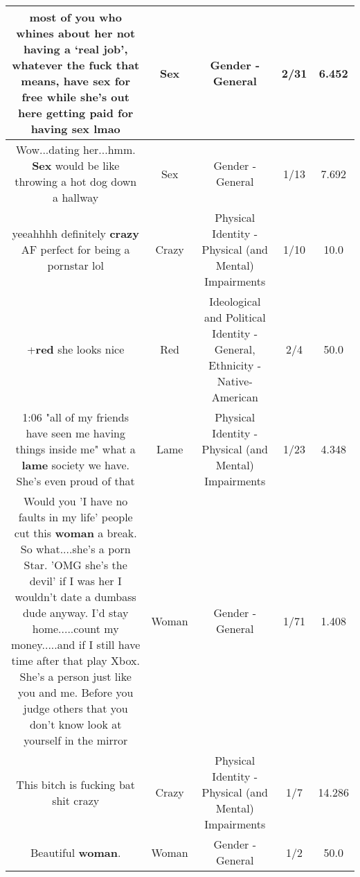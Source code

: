 \documentclass[11pt]{article}
\newlength\mylength
\begin{document}
\begin{center}
\begin{longtable}{|C{.65\mylength}|C{.30\mylength}|C{.12\mylength}|C{.12\mylength}|C{.12\mylength}|}
  \small most of you who whines about her not having a ‘real job', whatever the fuck that means, have \textbf{sex} for free while she's out here getting paid for having \textbf{sex} lmao\normalsize   & Sex & Gender - General & 2/31 & 6.452 \\  \hline
  \small Wow...dating her...hmm. \textbf{Sex} would be like throwing a hot dog down a hallway\normalsize   & Sex & Gender - General & 1/13 & 7.692 \\  \hline
  \small yeeahhhh definitely \textbf{crazy} AF perfect for being a pornstar lol\normalsize   & Crazy & Physical Identity - Physical (and Mental) Impairments & 1/10 & 10.0 \\  \hline
  \small +\textbf{r\textbf{ed}} she looks nice\normalsize   & Red &  Ideological and Political Identity - General, Ethnicity - Native-American & 2/4 & 50.0 \\  \hline
  \small 1:06 "all of my friends have seen me having things inside me" what a \textbf{lame} society we have. She's even proud of that\normalsize   & Lame & Physical Identity - Physical (and Mental) Impairments & 1/23 & 4.348 \\  \hline
  \small Would you 'I have no faults in my life' people cut this \textbf{woman} a break. So what....she's a porn Star. 'OMG she's the devil'  if I was her I wouldn't date a dumbass dude anyway. I'd stay home.....count my money.....and if I still have time after that play Xbox.  She's a person just like you and me. Before you judge others that you don't know look at yourself in the mirror\normalsize   & Woman & Gender - General & 1/71 & 1.408 \\  \hline
  \small This bitch is fucking bat shit crazy\normalsize   & Crazy & Physical Identity - Physical (and Mental) Impairments & 1/7 & 14.286 \\  \hline
  \small Beautiful \textbf{woman}.\normalsize   & Woman & Gender - General & 1/2 & 50.0 \\  \hline

\end{longtable}
\end{center}
\end{document}
